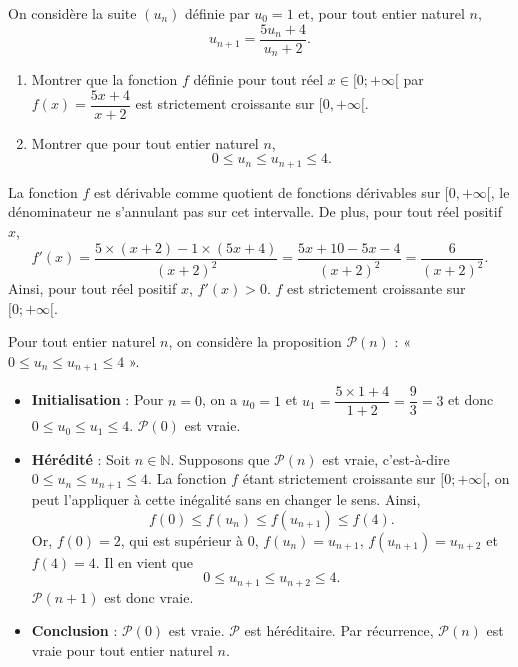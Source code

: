 \documentclass[11pt,fleqn]{book} %
\begin{document}
\begin{exercise}[topic=rec03,subtitle={(Métropole 2021)}] On considère la suite \((u_n)\) définie par \(u_0=1\) et, pour tout entier naturel \(n\),
\[u_{n+1}=\dfrac{5u_n+4}{u_n+2}.\]

\begin{enumerate}
\item Montrer que la fonction \(f\) définie pour tout réel \(x\in [0;+\infty [ \) par \(f(x)=\dfrac{5x+4}{x+2}\) est strictement croissante sur \([0,+\infty [\).
\item Montrer que pour tout entier naturel \(n\), 
\[ 0 \leqslant u_n \leqslant u_{n+1} \leqslant 4.\]
\end{enumerate}\end{exercise}
\begin{solution}La fonction \(f\) est dérivable comme quotient de fonctions dérivables sur \([0,+\infty [\), le dénominateur ne s'annulant pas sur cet intervalle. De plus, pour tout réel positif \(x\),
\[f'(x) = \dfrac{5 \times (x+2) - 1 \times (5x+4)}{(x+2)^2} = \dfrac{5x+10-5x-4}{(x+2)^2}=\dfrac{6}{(x+2)^2}.\]
Ainsi, pour tout réel positif \(x\), \(f'(x)> 0\). \(f\) est strictement croissante sur \([0;+\infty[\).

 Pour tout entier naturel \(n\), on considère la proposition \(\mathcal{P}(n)\) : « \(0 \leqslant u_n \leqslant u_{n+1} \leqslant 4\) ».
\begin{itemize} \item \textbf{Initialisation} : Pour \(n=0\), on a \(u_0=1\) et \(u_1 = \dfrac{5\times 1+4}{1+2} =\dfrac{9}{3}=3\) et donc \(0 \leqslant u_0 \leqslant u_1 \leqslant 4\). \(\mathcal{P}(0)\) est vraie.
\item \textbf{Hérédité} : Soit \(n\in\mathbb{N}\). Supposons que \(\mathcal{P}(n)\) est vraie, c'est-à-dire \(0 \leqslant u_n \leqslant u_{n+1} \leqslant 4\). 
La fonction \(f\) étant strictement croissante sur \([0;+\infty[ \), on peut l'appliquer à cette inégalité sans en changer le sens. Ainsi,
\[f(0) \leqslant f(u_n) \leqslant f(u_{n+1}) \leqslant f(4).\]
Or, \(f(0)=2\), qui est supérieur à 0, \(f(u_n)=u_{n+1}\), \(f(u_{n+1})=u_{n+2}\) et \(f(4)=4\). Il en vient que
\[0 \leqslant u_{n+1} \leqslant u_{n+2} \leqslant 4.\]
\(\mathcal{P}(n+1)\) est donc vraie.
\item \textbf{Conclusion} : \(\mathcal{P}(0)\) est vraie. \(\mathcal{P}\) est héréditaire. Par récurrence, \(\mathcal{P}(n)\) est vraie pour tout entier naturel \(n\).\end{itemize}\end{solution}
\end{document}
